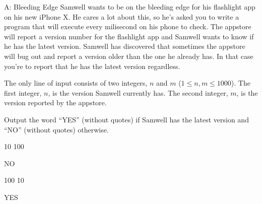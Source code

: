 \begin{problem}{A: Bleeding Edge}
Samwell wants to be on the bleeding edge for his flashlight app on his new iPhone X.
He cares a lot about this, so he's asked you to write a program that will execute every milisecond on his phone to check.
The appstore will report a version number for the flashlight app and Samwell wants to know if he has the latest version.
Samwell has discovered that sometimes the appstore will bug out and report a version older than the one he already has.
In that case you're to report that he has the latest version regardless.
\end{problem}

\begin{formalin}
The only line of input consists of two integers, $n$ and $m$ ($1 \leq n, m \leq 1000$).
The first integer, $n$, is the version Samwell currently has.
The second integer, $m$, is the version reported by the appstore.
\end{formalin}

\begin{formalout}
Output the word ``YES'' (without quotes) if Samwell has the latest version and ``NO'' (without quotes) otherwise.
\end{formalout}

\begin{datain}
10 100
\end{datain}

\begin{dataout}
NO
\end{dataout}

\begin{datain}
100 10
\end{datain}

\begin{dataout}
YES
\end{dataout}
